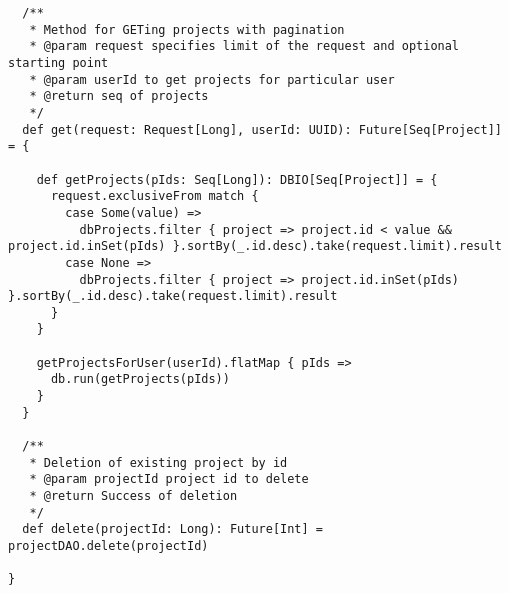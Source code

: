 \begin{lstlisting}
  /**
   * Method for GETing projects with pagination
   * @param request specifies limit of the request and optional starting point
   * @param userId to get projects for particular user
   * @return seq of projects
   */
  def get(request: Request[Long], userId: UUID): Future[Seq[Project]] = {

    def getProjects(pIds: Seq[Long]): DBIO[Seq[Project]] = {
      request.exclusiveFrom match {
        case Some(value) =>
          dbProjects.filter { project => project.id < value && project.id.inSet(pIds) }.sortBy(_.id.desc).take(request.limit).result
        case None =>
          dbProjects.filter { project => project.id.inSet(pIds) }.sortBy(_.id.desc).take(request.limit).result
      }
    }

    getProjectsForUser(userId).flatMap { pIds =>
      db.run(getProjects(pIds))
    }
  }

  /**
   * Deletion of existing project by id
   * @param projectId project id to delete
   * @return Success of deletion
   */
  def delete(projectId: Long): Future[Int] = projectDAO.delete(projectId)

}
\end{lstlisting}
